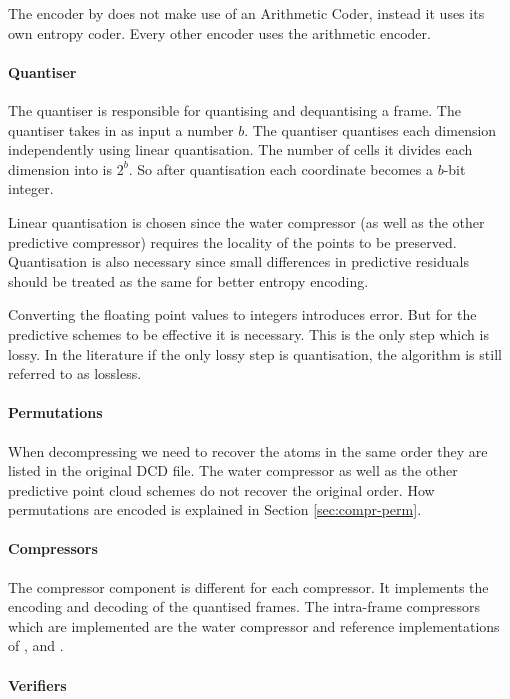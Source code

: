 \documentclass[a4paper]{report}
\begin{document}
The encoder by \citet{omeltchenko2000sls} does not make use of an Arithmetic
Coder, instead it uses its own entropy coder. Every other encoder uses the
arithmetic encoder.


\paragraph{Quantiser}

The quantiser is responsible for quantising and dequantising a frame. The
quantiser takes in as input a number $b$. The quantiser quantises each
dimension independently using linear quantisation. The number of cells it
divides each dimension into is $2^b$. So after quantisation each coordinate
becomes a $b$-bit integer.

Linear quantisation is chosen since the water compressor (as well as the other
predictive compressor) requires the locality of the points to be
preserved. Quantisation is also necessary since small differences in
predictive residuals should be treated as the same for better entropy
encoding.

Converting the floating point values to integers introduces error. But for the
predictive schemes to be effective it is necessary. This is the only step
which is lossy. In the literature if the only lossy step is quantisation, the
algorithm is still referred to as lossless.


\paragraph{Permutations}

When decompressing we need to recover the atoms in the same order they are
listed in the original DCD file. The water compressor as well as the other
predictive point cloud schemes do not recover the original order. How
permutations are encoded is explained in Section \ref{sec:compr-perm}.


\paragraph{Compressors}

The compressor component is different for each compressor. It implements the
encoding and decoding of the quantised frames. The intra-frame compressors
which are implemented are the water compressor and reference implementations
of \citet{omeltchenko2000sls}, \citet{gumholdcomp} and
\citet{devillers2000gci}.


\paragraph{Verifiers}
\end{document}
